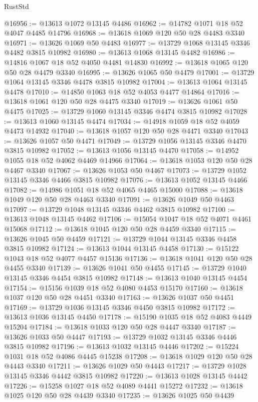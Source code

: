 \begin{lexlean}{RustStd}
\begin{coremodule}
@16956 := @13613 @1072 @13145 @4486
@16962 := @14782 @1071 @18 @52 @4047 @4485 @14796
@16968 := @13618 @1069 @120 @50 @28 @4483 @3340
@16971 := @13626 @1069 @50 @4483
@16977 := @13729 @1068 @13145 @3346 @4482 @3815 @10982
@16980 := @13613 @1068 @13145 @4482
@16986 := @14816 @1067 @18 @52 @4050 @4481 @14830
@16992 := @13618 @1065 @120 @50 @28 @4479 @3340
@16995 := @13626 @1065 @50 @4479
@17001 := @13729 @1064 @13145 @3346 @4478 @3815 @10982
@17004 := @13613 @1064 @13145 @4478
@17010 := @14850 @1063 @18 @52 @4053 @4477 @14864
@17016 := @13618 @1061 @120 @50 @28 @4475 @3340
@17019 := @13626 @1061 @50 @4475
@17025 := @13729 @1060 @13145 @3346 @4474 @3815 @10982
@17028 := @13613 @1060 @13145 @4474
@17034 := @14918 @1059 @18 @52 @4059 @4473 @14932
@17040 := @13618 @1057 @120 @50 @28 @4471 @3340
@17043 := @13626 @1057 @50 @4471
@17049 := @13729 @1056 @13145 @3346 @4470 @3815 @10982
@17052 := @13613 @1056 @13145 @4470
@17058 := @14952 @1055 @18 @52 @4062 @4469 @14966
@17064 := @13618 @1053 @120 @50 @28 @4467 @3340
@17067 := @13626 @1053 @50 @4467
@17073 := @13729 @1052 @13145 @3346 @4466 @3815 @10982
@17076 := @13613 @1052 @13145 @4466
@17082 := @14986 @1051 @18 @52 @4065 @4465 @15000
@17088 := @13618 @1049 @120 @50 @28 @4463 @3340
@17091 := @13626 @1049 @50 @4463
@17097 := @13729 @1048 @13145 @3346 @4462 @3815 @10982
@17100 := @13613 @1048 @13145 @4462
@17106 := @15054 @1047 @18 @52 @4071 @4461 @15068
@17112 := @13618 @1045 @120 @50 @28 @4459 @3340
@17115 := @13626 @1045 @50 @4459
@17121 := @13729 @1044 @13145 @3346 @4458 @3815 @10982
@17124 := @13613 @1044 @13145 @4458
@17130 := @15122 @1043 @18 @52 @4077 @4457 @15136
@17136 := @13618 @1041 @120 @50 @28 @4455 @3340
@17139 := @13626 @1041 @50 @4455
@17145 := @13729 @1040 @13145 @3346 @4454 @3815 @10982
@17148 := @13613 @1040 @13145 @4454
@17154 := @15156 @1039 @18 @52 @4080 @4453 @15170
@17160 := @13618 @1037 @120 @50 @28 @4451 @3340
@17163 := @13626 @1037 @50 @4451
@17169 := @13729 @1036 @13145 @3346 @4450 @3815 @10982
@17172 := @13613 @1036 @13145 @4450
@17178 := @15190 @1035 @18 @52 @4083 @4449 @15204
@17184 := @13618 @1033 @120 @50 @28 @4447 @3340
@17187 := @13626 @1033 @50 @4447
@17193 := @13729 @1032 @13145 @3346 @4446 @3815 @10982
@17196 := @13613 @1032 @13145 @4446
@17202 := @15224 @1031 @18 @52 @4086 @4445 @15238
@17208 := @13618 @1029 @120 @50 @28 @4443 @3340
@17211 := @13626 @1029 @50 @4443
@17217 := @13729 @1028 @13145 @3346 @4442 @3815 @10982
@17220 := @13613 @1028 @13145 @4442
@17226 := @15258 @1027 @18 @52 @4089 @4441 @15272
@17232 := @13618 @1025 @120 @50 @28 @4439 @3340
@17235 := @13626 @1025 @50 @4439

\end{coremodule}
\end{lexlean}
